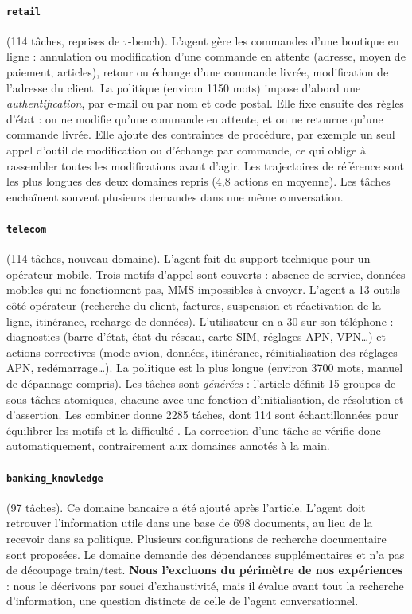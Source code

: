 \paragraph{\texttt{retail}} (114 tâches, reprises de $\tau$-bench). L'agent gère les commandes d'une boutique en ligne : annulation ou modification d'une commande en attente (adresse, moyen de paiement, articles), retour ou échange d'une commande livrée, modification de l'adresse du client. La politique (environ 1150 mots) impose d'abord une \emph{authentification}, par e-mail ou par nom et code postal. Elle fixe ensuite des règles d'état : on ne modifie qu'une commande en attente, et on ne retourne qu'une commande livrée. Elle ajoute des contraintes de procédure, par exemple un seul appel d'outil de modification ou d'échange par commande, ce qui oblige à rassembler toutes les modifications avant d'agir. Les trajectoires de référence sont les plus longues des deux domaines repris (4,8 actions en moyenne). Les tâches enchaînent souvent plusieurs demandes dans une même conversation.

\paragraph{\texttt{telecom}} (114 tâches, nouveau domaine). L'agent fait du support technique pour un opérateur mobile. Trois motifs d'appel sont couverts : absence de service, données mobiles qui ne fonctionnent pas, MMS impossibles à envoyer. L'agent a 13 outils côté opérateur (recherche du client, factures, suspension et réactivation de la ligne, itinérance, recharge de données). L'utilisateur en a 30 sur son téléphone : diagnostics (barre d'état, état du réseau, carte SIM, réglages APN, VPN\ldots) et actions correctives (mode avion, données, itinérance, réinitialisation des réglages APN, redémarrage\ldots). La politique est la plus longue (environ 3700 mots, manuel de dépannage compris). Les tâches sont \emph{générées} : l'article définit 15 groupes de sous-tâches atomiques, chacune avec une fonction d'initialisation, de résolution et d'assertion. Les combiner donne 2285 tâches, dont 114 sont échantillonnées pour équilibrer les motifs et la difficulté \cite{barres2025tau2}. La correction d'une tâche se vérifie donc automatiquement, contrairement aux domaines annotés à la main.

\paragraph{\texttt{banking\_knowledge}} (97 tâches). Ce domaine bancaire a été ajouté après l'article. L'agent doit retrouver l'information utile dans une base de 698 documents, au lieu de la recevoir dans sa politique. Plusieurs configurations de recherche documentaire sont proposées. Le domaine demande des dépendances supplémentaires et n'a pas de découpage train/test. \textbf{Nous l'excluons du périmètre de nos expériences} : nous le décrivons par souci d'exhaustivité, mais il évalue avant tout la recherche d'information, une question distincte de celle de l'agent conversationnel.

